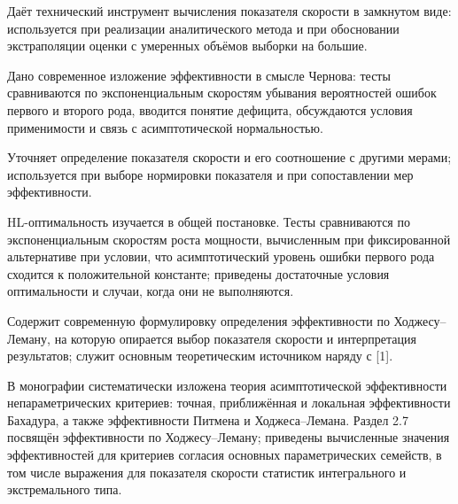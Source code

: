 \why Даёт технический инструмент вычисления показателя скорости в замкнутом виде:
используется при реализации аналитического метода и при обосновании экстраполяции оценки с
умеренных объёмов выборки на большие.


\review Дано современное изложение эффективности в смысле Чернова: тесты сравниваются по
экспоненциальным скоростям убывания вероятностей ошибок первого и второго рода, вводится
понятие дефицита, обсуждаются условия применимости и связь с асимптотической нормальностью.

\why Уточняет определение показателя скорости и его соотношение с другими мерами;
используется при выборе нормировки показателя и при сопоставлении мер эффективности.


\review HL-оптимальность изучается в общей постановке. Тесты сравниваются по экспоненциальным
скоростям роста мощности, вычисленным при фиксированной альтернативе при условии, что
асимптотический уровень ошибки первого рода сходится к положительной константе; приведены
достаточные условия оптимальности и случаи, когда они не выполняются.

\why Содержит современную формулировку определения эффективности по Ходжесу--Леману,
на которую опирается выбор показателя скорости и интерпретация результатов; служит
основным теоретическим источником наряду с [1].


\review В монографии систематически изложена теория асимптотической эффективности
непараметрических критериев: точная, приближённая и локальная эффективности Бахадура, а
также эффективности Питмена и Ходжеса--Лемана. Раздел 2.7 посвящён эффективности по
Ходжесу--Леману; приведены вычисленные значения эффективностей для критериев согласия
основных параметрических семейств, в том числе выражения для показателя скорости статистик
интегрального и экстремального типа.

